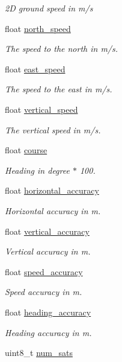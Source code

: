 \begin{DoxyCompactItemize}
\begin{DoxyCompactList}\small\item\em 2\+D ground speed in m/s \end{DoxyCompactList}\item 
float \hyperlink{structgps__t_aa6ae22c930094f8374a745d83b8e901f}{north\+\_\+speed}
\begin{DoxyCompactList}\small\item\em The speed to the north in m/s. \end{DoxyCompactList}\item 
float \hyperlink{structgps__t_aec49e46c78d21a3fb4f230585afc045e}{east\+\_\+speed}
\begin{DoxyCompactList}\small\item\em The speed to the east in m/s. \end{DoxyCompactList}\item 
float \hyperlink{structgps__t_a106d8859fb11e943fc996c557516d9d1}{vertical\+\_\+speed}
\begin{DoxyCompactList}\small\item\em The vertical speed in m/s. \end{DoxyCompactList}\item 
float \hyperlink{structgps__t_a7d2135669d6fc88c68dbe3459d505a7a}{course}
\begin{DoxyCompactList}\small\item\em Heading in degree $\ast$ 100. \end{DoxyCompactList}\item 
float \hyperlink{structgps__t_ae7f7b21657d1adb7038bd3933d4a81c3}{horizontal\+\_\+accuracy}
\begin{DoxyCompactList}\small\item\em Horizontal accuracy in m. \end{DoxyCompactList}\item 
float \hyperlink{structgps__t_a77d406fee7543f2b91f1cef1ecdb25c2}{vertical\+\_\+accuracy}
\begin{DoxyCompactList}\small\item\em Vertical accuracy in m. \end{DoxyCompactList}\item 
float \hyperlink{structgps__t_a3005316cefe45bbaf45b68d5155f49c5}{speed\+\_\+accuracy}
\begin{DoxyCompactList}\small\item\em Speed accuracy in m. \end{DoxyCompactList}\item 
float \hyperlink{structgps__t_a04072a8af0b17a88a8a8fdede6ab5555}{heading\+\_\+accuracy}
\begin{DoxyCompactList}\small\item\em Heading accuracy in m. \end{DoxyCompactList}\item 
\hypertarget{structgps__t_a1a0590caa447cc0c5e8537dac9262516}{uint8\+\_\+t \hyperlink{structgps__t_a1a0590caa447cc0c5e8537dac9262516}{num\+\_\+sats}}\label{structgps__t_a1a0590caa447cc0c5e8537dac9262516}


\end{DoxyCompactItemize}
